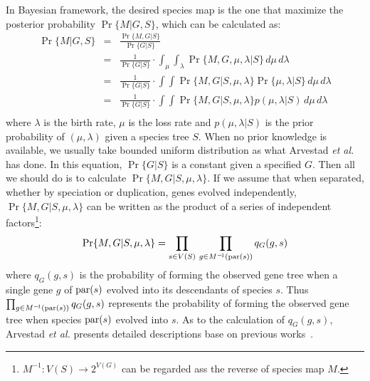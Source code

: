 In Bayesian framework, the desired species map is the one that maximize the posterior
probability $\Pr\{M|G,S\}$, which can be calculated as:
\begin{eqnarray*}
\Pr\{M|G,S\}&=&\frac{\Pr\{M,G|S\}}{\Pr\{G|S\}}\\
	&=& \frac{1}{\Pr\{G|S\}}\cdot\int_{\mu}\int_{\lambda}\Pr\{M,G,\mu,\lambda|S\}\,d\mu\,d\lambda \\
	&=& \frac{1}{\Pr\{G|S\}}\cdot\int\!\!\!\int\Pr\{M,G|S,\mu,\lambda\}\Pr\{\mu,\lambda|S\}\,d\mu\,d\lambda \\
	&=& \frac{1}{\Pr\{G|S\}}\cdot\int\!\!\!\int\Pr\{M,G|S,\mu,\lambda\}p(\mu,\lambda|S)\,d\mu\,d\lambda \\
\end{eqnarray*}
where $\lambda$ is the birth rate, $\mu$ is the loss rate and
$p(\mu,\lambda|S)$ is the prior probability of $(\mu,\lambda)$ given a species tree $S$.
When no prior knowledge is available, we usually take bounded uniform distribution as what Arvestad {\it et al.}
has done. In this equation, $\Pr\{G|S\}$ is a constant given a specified $G$. Then all we should do
is to calculate $\Pr\{M,G|S,\mu,\lambda\}$. If we assume that when separated, whether by speciation or duplication,
genes evolved independently, $\Pr\{M,G|S,\mu,\lambda\}$ can be written as
the product of a series of independent factors\footnote{$M^{-\!1}:V(S)\rightarrow 2^{V(G)}$ can be regarded ass the reverse
of species map $M$.}:
\begin{equation}
\Pr\{M,G|S,\mu,\lambda\}=\prod_{s\in V(S)}\,\prod_{g\in M^{-\!1}(\mathrm{par}(s))}q_G(g,s)
\end{equation}
where $q_G(g,s)$ is the probability of forming the observed gene tree when a single gene $g$ of $\mathrm{par}(s)$ evolved into
its descendants of species $s$. Thus $\prod_{g\in M^{-\!1}(\mathrm{par}(s))}q_G(g,s)$
represents the probability of forming the observed gene tree when species $\mathrm{par}(s)$ evolved into $s$.
As to the calculation of $q_G(g,s)$, Arvestad {\it et al.} presents detailed descriptions base on previous works~\cite{nee94,yang97}.


